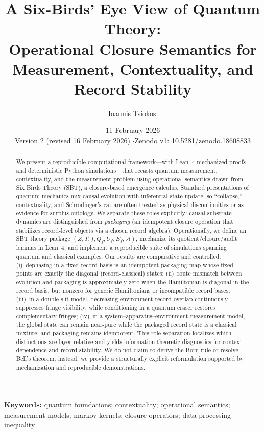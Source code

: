\documentclass[11pt]{article}
\title{A Six-Birds' Eye View of Quantum Theory:\\Operational Closure Semantics for Measurement, Contextuality, and Record Stability}
\author{Ioannis Tsiokos\,\orcidlink{0009-0009-7659-5964}}
\affiliation{}
\date{11 February 2026\\[4pt]{\small Version 2 (revised 16 February 2026) \quad$\cdot$\quad Zenodo v1: \href{https://doi.org/10.5281/zenodo.18608833}{10.5281/zenodo.18608833}}}
\makeatletter
\newcommand{\printaffiliation}{\begin{center}\small \@affiliation\end{center}}
\makeatother
\begin{document}
\maketitle
\thispagestyle{firstpage}
\printaffiliation
\begin{abstract}
We present a reproducible computational framework---with Lean~4 mechanized proofs and deterministic Python simulations---that recasts quantum measurement, contextuality, and the measurement problem using operational semantics drawn from Six Birds Theory (SBT), a closure-based emergence calculus. Standard presentations of quantum mechanics mix causal evolution with inferential state update, so ``collapse,'' contextuality, and Schr\"odinger's cat are often treated as physical discontinuities or as evidence for surplus ontology. We separate these roles explicitly: causal substrate dynamics are distinguished from \emph{packaging} (an idempotent closure operation that stabilizes record-level objects via a chosen record algebra). Operationally, we define an SBT theory package $(Z,T,f,Q_f,U_f,E_f,\mathcal{A})$, mechanize its quotient/closure/audit lemmas in Lean~4, and implement a reproducible suite of simulations spanning quantum and classical examples. Our results are comparative and controlled: (i)~dephasing in a fixed record basis is an idempotent packaging map whose fixed points are exactly the diagonal (record-classical) states; (ii)~route mismatch between evolution and packaging is approximately zero when the Hamiltonian is diagonal in the record basis, but nonzero for generic Hamiltonians or incompatible record bases; (iii)~in a double-slit model, decreasing environment-record overlap continuously suppresses fringe visibility, while conditioning in a quantum eraser restores complementary fringes; (iv)~in a system--apparatus--environment measurement model, the global state can remain near-pure while the packaged record state is a classical mixture, and packaging remains idempotent. This role separation localizes which distinctions are layer-relative and yields information-theoretic diagnostics for context dependence and record stability. We do not claim to derive the Born rule or resolve Bell's theorem; instead, we provide a structurally explicit reformulation supported by mechanization and reproducible demonstrations.
\end{abstract}

\vspace{1ex}
\noindent\textbf{Keywords:} quantum foundations; contextuality; operational semantics; measurement models; markov kernels; closure operators; data-processing inequality













\appendix






\end{document}
